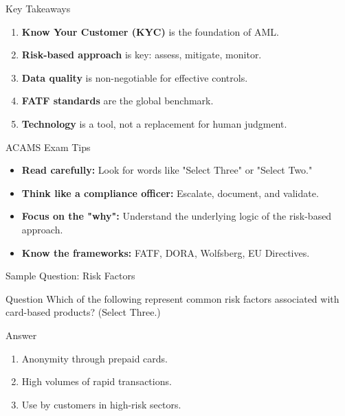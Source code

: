 \documentclass{beamer}
\begin{document}
	\begin{frame}{Key Takeaways}
		\begin{enumerate}
			\item \textbf{Know Your Customer (KYC)} is the foundation of AML.
			\item \textbf{Risk-based approach} is key: assess, mitigate, monitor.
			\item \textbf{Data quality} is non-negotiable for effective controls.
			\item \textbf{FATF standards} are the global benchmark.
			\item \textbf{Technology} is a tool, not a replacement for human judgment.
		\end{enumerate}
	\end{frame}
	
	\begin{frame}{ACAMS Exam Tips}
		\begin{itemize}
			\item \textbf{Read carefully:} Look for words like "Select Three" or "Select Two."
			\item \textbf{Think like a compliance officer:} Escalate, document, and validate.
			\item \textbf{Focus on the "why":} Understand the underlying logic of the risk-based approach.
			\item \textbf{Know the frameworks:} FATF, DORA, Wolfsberg, EU Directives.
		\end{itemize}
	\end{frame}
	
	\begin{frame}{Sample Question: Risk Factors}
		\begin{block}{Question}
			Which of the following represent common risk factors associated with card-based products? (Select Three.)
		\end{block}
		\begin{block}{Answer}
			\begin{enumerate}
				\item Anonymity through prepaid cards.
				\item High volumes of rapid transactions.
				\item Use by customers in high-risk sectors.
			\end{enumerate}
		\end{block}
	\end{frame}
	
\end{document}
